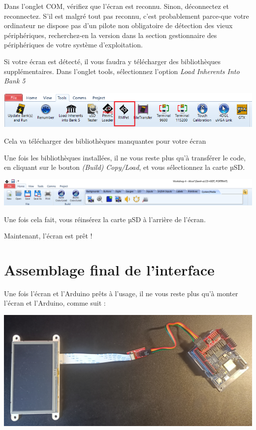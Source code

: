 \documentclass[11pt]{article}
\begin{document}
Dans l'onglet COM, vérifiez que l'écran est reconnu. Sinon, déconnectez et reconnectez.
S'il est malgré tout pas reconnu, c'est probablement parce-que votre ordinateur ne dispose pas d'un pilote non obligatoire de détection des vieux périphériques, recherchez-en la version dans la section gestionnaire des périphériques de votre système d'exploitation.

Si votre écran est détecté, il vous faudra y télécharger des bibliothèques supplémentaires.
Dans l'onglet tools, sélectionnez l'option \emph{Load Inherents Into Bank 5}

\includegraphics[width=\textwidth]{Format5.png}

Cela va télécharger des bibliothèques manquantes pour votre écran 

Une fois les bibliothèques installées, il ne vous reste plus qu'à transférer le code, en cliquant sur le bouton \emph{(Build) Copy/Load}, et vous sélectionnez la carte µSD.

\includegraphics[width=\textwidth]{Transf1.png}

Une fois cela fait, vous réinsérez la carte µSD à l'arrière de l'écran.

Maintenant, l'écran est prêt !

\newpage

\section{Assemblage final de l'interface}

Une fois l'écran et l'Arduino prêts à l'usage, il ne vous reste plus qu'à monter l'écran et l'Arduino, comme suit :

\includegraphics[width=\textwidth]{Appareil.jpg}
\end{document}
